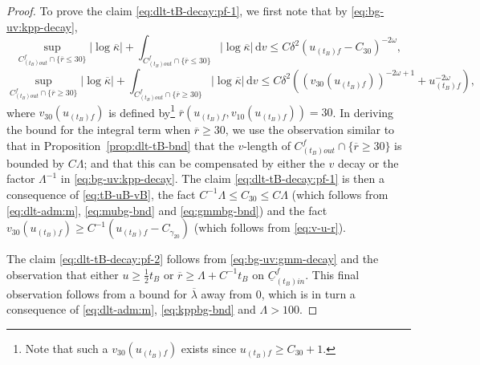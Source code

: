 \documentclass[10pt, reqno]{amsart}
\theoremstyle{definition}
\theoremstyle{remark}
\theoremstyle{conjecture}
\numberwithin{equation}{section}
\newcommand{\abs}[1]{\vert#1\vert}
\newcommand{\set}[1]{\{#1\}}
\newcommand{\ud}{\mathrm{d}}
\newcommand{\0}{\emptyset}
\newcommand{\kpp}{\kappa}
\newcommand{\lmb}{\lambda}
\newcommand{\Lmb}{\Lambda}
\newcommand{\omg}{\omega}
\newcommand{\uC}{\underline{C}}
\newcommand{\dvr}{\lmb}
\newcommand{\de}{\delta}
\newcommand{\rbg}{\overline{r}}					%
\newcommand{\kppbg}{\overline{\kpp}}					%
\begin{document}
\begin{proof}
To prove the claim \eqref{eq:dlt-tB-decay:pf-1}, we first note that by \eqref{eq:bg-uv:kpp-decay},
$$\sup_{C_{(t_{B}) out}^{f}\cap\{\rbg\leq 30\}} \abs{\log \kppbg} + \int_{C_{(t_{B}) out}^{f}\cap\{\rbg\leq 30\}} \abs{\log \kppbg} \, \ud v \leq C \de^2 (u_{(t_B)f}-C_{30})^{-2\omg},$$
$$\sup_{C_{(t_{B}) out}^{f}\cap\{\rbg\geq 30\}} \abs{\log \kppbg} + \int_{C_{(t_{B}) out}^{f}\cap\{\rbg\geq 30\}} \abs{\log \kppbg} \, \ud v \leq C \de^2 \left(\left(v_{30}(u_{(t_B)f})\right)^{-2\omg+1} + u_{(t_B)f}^{-2\omg}\right),$$
where $v_{30}(u_{(t_B)f})$ is defined by\footnote{Note that such a $v_{30}(u_{(t_B)f})$ exists since $u_{(t_B)f}\geq C_{30}+1$.} $\rbg(u_{(t_B)f}, v_{10}(u_{(t_B)f}))=30$.
In deriving the bound for the integral term when $\rbg\geq 30$, we use the observation similar to that in Proposition~\ref{prop:dlt-tB-bnd} that the $v$-length of $C^{f}_{(t_{B}) out} \cap \set{\rbg \geq 30}$ is bounded by $C \Lmb$; and that this can be compensated by either the $v$ decay or the factor $\Lmb^{-1}$ in \eqref{eq:bg-uv:kpp-decay}. The claim \eqref{eq:dlt-tB-decay:pf-1} is then a consequence of \eqref{eq:tB-uB-vB}, the fact $C^{-1}\Lambda\leq C_{30}\leq C\Lambda$ (which follows from \eqref{eq:dlt-adm:m}, \eqref{eq:mubg-bnd} and \eqref{eq:gmmbg-bnd}) and the fact $v_{30}(u_{(t_B)f})\geq C^{-1} (u_{(t_B)f}-C_{\gamma_{20}})$ (which follows from \eqref{eq:v-u-r}).


The claim \eqref{eq:dlt-tB-decay:pf-2} follows from \eqref{eq:bg-uv:gmm-decay} and the observation that either $u \geq \frac{1}{2} t_{B}$ or $\rbg \geq \Lmb + C^{-1} t_{B}$ on $\uC^{f}_{(t_{B}) in}$. This final observation follows from a bound for $\overline{\lambda}$ away from $0$, which is in turn a consequence of \eqref{eq:dlt-adm:m}, \eqref{eq:kppbg-bnd} and $\Lambda>100$. \qedhere
\end{proof}
\end{document}
